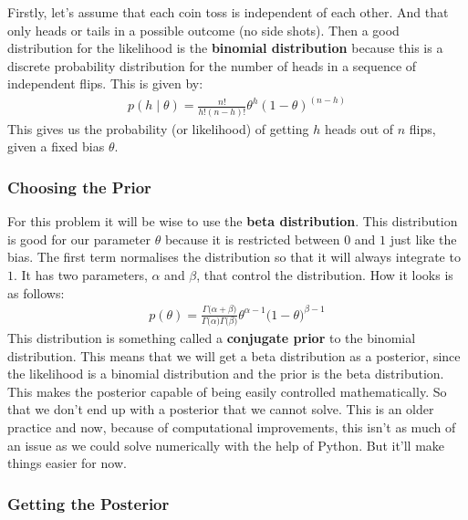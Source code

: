 \documentclass[11pt]{article}   %
\begin{document}
Firstly, let's assume that each coin toss is independent of each other. And that only heads
or tails in a possible outcome (no side shots). Then a good distribution for the likelihood
is the \textbf{binomial distribution} because this is a discrete probability distribution for the
number of heads in a sequence of independent 
flips. This is given by:
\begin{align}\label{Binomial Distribution}
p(h\mid\theta) = \frac{n!}{h!(n - h)!}\theta^h(1 - \theta)^{(n-h)}
\end{align}
This gives us the probability (or likelihood) of getting $h$ heads out of $n$ flips, given a fixed bias $\theta$.

\subsubsection{Choosing the Prior}\label{Choosing the Prior}

For this problem it will be wise to use the \textbf{beta distribution}. This distribution is good for our parameter $\theta$ because it is restricted between $0$ and $1$ just like the bias. The first term normalises the distribution so that it will always integrate to $1$. It has two parameters, $\alpha$ and $\beta$, that control the distribution. How it looks is as follows:
\begin{align}\label{Beta Distribution}
p(\theta) = \frac{\Gamma\big(\alpha + \beta\big)}{\Gamma\big(\alpha\big)\Gamma\big(\beta\big)}\theta^{\alpha - 1}\big(1 - \theta\big)^{\beta - 1}
\end{align}
This distribution is something called a \textbf{conjugate prior} to the binomial distribution. This means that we will get a beta distribution as a posterior, since the likelihood is a binomial distribution and the prior is the beta distribution. This makes the posterior capable of being easily controlled mathematically. So that we don't end up with a posterior that we cannot solve. This is an older practice and now, because of computational improvements, this isn't as much of an issue as we could solve numerically with the help of Python. But it'll make things easier for now.

\subsubsection{Getting the Posterior}\label{Getting the Posterior}
\end{document}
